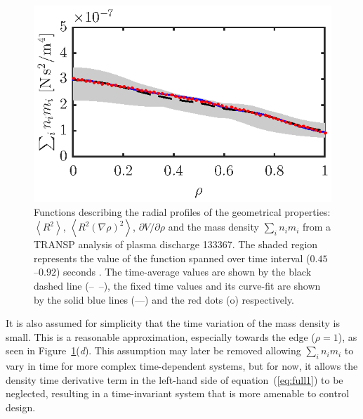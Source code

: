 \documentclass{iopart}
\begin{document}
\begin{figure}
\includegraphics{imene_figs/fig1d} \hspace{-3em}
\caption{Functions describing the radial profiles of the geometrical properties: $\left< R^2 \right>$, $\left< R^2 (\nabla\rho)^2 \right>$, $\partial V/\partial \rho$ and  the mass density $ \sum_i n_i m_i $ from a TRANSP analysis of plasma discharge 133367.  The shaded region represents the value of the function spanned over time interval ($0.45$--$0.92$) seconds . The time-average values are shown by the black dashed line (--~--), the fixed time values and its curve-fit are shown by the solid blue lines (---) and the red dots (o) respectively.}
\label{fig:geofunc}
\end{figure}

It is also assumed for simplicity that the time variation of the mass density is
small.  This is a reasonable approximation, especially towards the edge ($\rho=1$), as seen in Figure~{\ref{fig:geofunc}}(\emph{d}).
This assumption may later be removed allowing $ \sum_i n_i m_i $  to vary in
time for more complex time-dependent systems, but for now, it allows the density
time derivative term in the left-hand side of equation~(\ref{eq:full1}) to be
neglected, resulting in a time-invariant system that is more amenable to control
design.
 
\end{document}
